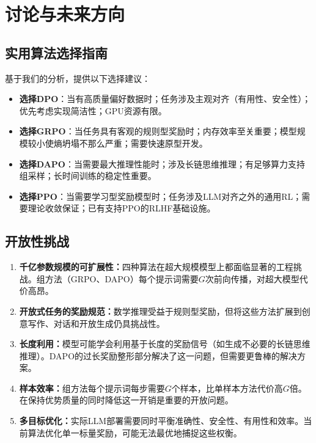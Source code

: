\section{讨论与未来方向}
\label{sec:discuss}

\subsection{实用算法选择指南}

基于我们的分析，提供以下选择建议：

\begin{itemize}[leftmargin=*, itemsep=2pt]
\item \textbf{选择DPO}：当有高质量偏好数据时；任务涉及主观对齐（有用性、安全性）；优先考虑实现简洁性；GPU资源有限。
\item \textbf{选择GRPO}：当任务具有客观的规则型奖励时；内存效率至关重要；模型规模较小使熵坍塌不那么严重；需要快速原型开发。
\item \textbf{选择DAPO}：当需要最大推理性能时；涉及长链思维推理；有足够算力支持组采样；长时间训练的稳定性重要。
\item \textbf{选择PPO}：当需要学习型奖励模型时；任务涉及LLM对齐之外的通用RL；需要理论收敛保证；已有支持PPO的RLHF基础设施。
\end{itemize}

\subsection{开放性挑战}

\begin{enumerate}[leftmargin=*, itemsep=2pt]
\item \textbf{千亿参数规模的可扩展性：}四种算法在超大规模模型上都面临显著的工程挑战。组方法（GRPO、DAPO）每个提示词需要$G$次前向传播，对超大模型代价高昂。
\item \textbf{开放式任务的奖励规范：}数学推理受益于规则型奖励，但将这些方法扩展到创意写作、对话和开放生成仍具挑战性。
\item \textbf{长度利用：}模型可能学会利用基于长度的奖励信号（如生成不必要的长链思维推理）。DAPO的过长奖励整形部分解决了这一问题，但需要更鲁棒的解决方案。
\item \textbf{样本效率：}组方法每个提示词每步需要$G$个样本，比单样本方法代价高$G$倍。在保持优势质量的同时降低这一开销是重要的开放问题。
\item \textbf{多目标优化：}实际LLM部署需要同时平衡准确性、安全性、有用性和效率。当前算法优化单一标量奖励，可能无法最优地捕捉这些权衡。
\end{enumerate}

